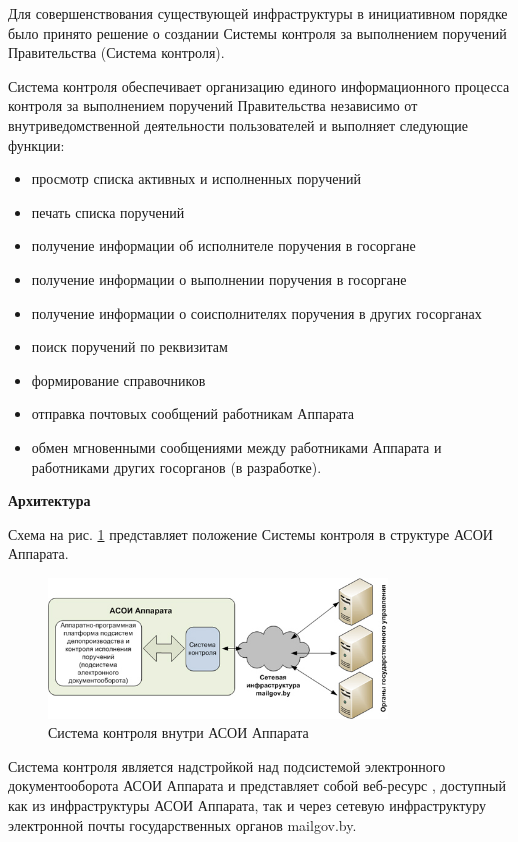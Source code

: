 \documentclass[10pt, a5paper]{article}
\begin{document}
Для совершенствования существующей инфраструктуры в инициативном порядке было принято решение о создании Системы контроля за выполнением поручений Правительства (Система контроля).

Система контроля обеспечивает организацию единого информационного процесса  контроля за выполнением поручений Правительства независимо от внутриведомственной деятельности пользователей и  выполняет следующие функции:

\begin{itemize}
  \item просмотр списка активных и исполненных поручений
  \item печать списка поручений
  \item получение информации об исполнителе поручения в госоргане
  \item получение информации о выполнении поручения в госоргане
  \item получение информации о соисполнителях поручения в других госорганах
  \item поиск поручений по реквизитам
  \item формирование справочников
  \item отправка почтовых сообщений работникам Аппарата
  \item обмен мгновенными сообщениями между работниками Аппарата и работниками других госорганов (в разработке).
\end{itemize}

\textbf{Архитектура}

Схема на рис. \ref{R1} представляет положение Системы контроля в структуре АСОИ Аппарата.

\begin{figure}[htpb]
  \centering
  \includegraphics[width=9cm]{110_2012_w_cmcntrlsys_figure1_1.jpg}
\caption{Система контроля внутри АСОИ Аппарата}
\label{R1}
\end{figure}

Система контроля является надстройкой над подсистемой электронного документооборота АСОИ Аппарата и представляет собой веб-ресурс , доступный как из инфраструктуры АСОИ Аппарата, так и через сетевую инфраструктуру электронной почты государственных органов mailgov.by.
\end{document}
